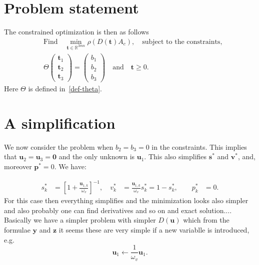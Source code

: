 \documentclass[12pt]{amsart}
\theoremstyle{definition}
\begin{document}
\section{Problem statement}
The constrained optimization is then as follows 
\begin{equation}
  \begin{aligned}
&    \mbox{Find}\quad \min_{\bm{t}\in \mathds{R}^{3mn}} 
\rho\left(D(\bm{t}) A_c\right), \quad\mbox{subject to the constraints,} \\
     & \Theta       
      \begin{pmatrix}
        \bm{t}_1\\
        \bm{t}_2\\
        \bm{t}_3
      \end{pmatrix} = 
      \begin{pmatrix}
        b_1\\
        b_2\\
        b_3
      \end{pmatrix}\quad\mbox{and}\quad \bm{t}\ge 0.
  \end{aligned}
\end{equation}
Here $\Theta$ is defined in~\ref{def-theta}.


\section{A simplification}
We now consider the problem when $b_2=b_3=0$ in the constraints. This implies that $\bm{u}_2=\bm{u}_3=\bm{0}$ and the only unknown is $\bm{u}_1$. This also simplifies 
$\bm{s}^*$ and $\bm{v}^*$, and, moreover $\bm{p}^*=0$. We have:

\begin{equation}\label{si-def}
  \begin{aligned}
  s_{k}^* &= \left\lbrack  1+\frac{\bm{u}_{1,k}}{\omega_v}\right\rbrack^{-1},\quad
  v_{k}^* &=  \frac{\bm{u}_{1,k}}{\omega_{v}}s_k^*=1-s_k^*,\quad \quad p_{k}^*&= 0. 
  \end{aligned}
  \end{equation}
  For this case then everything simplifies and the minimization looks also simpler and also probably one can find derivatives and so on and exact solution.... Basically we have a simpler problem with simpler $D(\bm{u})$ which from the formulae $\bm{y}$ and $\bm{z}$ it seems these are very simple if a new variablle is introduced, e.g. 
\begin{equation}
    \bm{u}_1\leftarrow  \frac{1}{\omega_v}\bm{u}_1.  
\end{equation}
\end{document}
